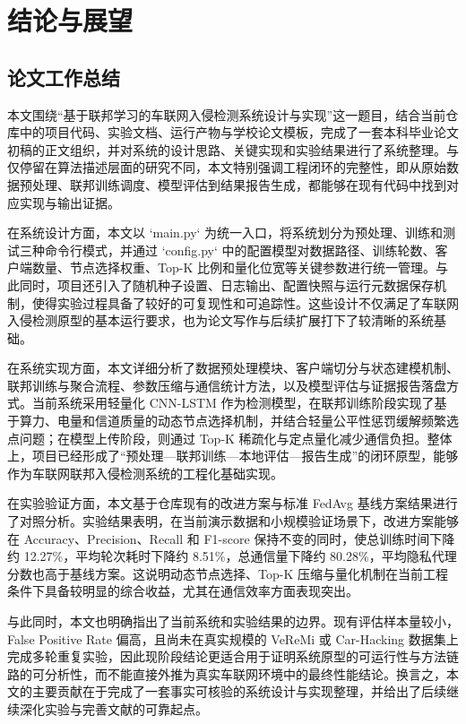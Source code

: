 \chapter{结论与展望}
\label{cha:conclusion}

\section{论文工作总结}

本文围绕“基于联邦学习的车联网入侵检测系统设计与实现”这一题目，结合当前仓库中的项目代码、实验文档、运行产物与学校论文模板，完成了一套本科毕业论文初稿的正文组织，并对系统的设计思路、关键实现和实验结果进行了系统整理。与仅停留在算法描述层面的研究不同，本文特别强调工程闭环的完整性，即从原始数据预处理、联邦训练调度、模型评估到结果报告生成，都能够在现有代码中找到对应实现与输出证据。

在系统设计方面，本文以 `main.py` 为统一入口，将系统划分为预处理、训练和测试三种命令行模式，并通过 `config.py` 中的配置模型对数据路径、训练轮数、客户端数量、节点选择权重、Top-K 比例和量化位宽等关键参数进行统一管理。与此同时，项目还引入了随机种子设置、日志输出、配置快照与运行元数据保存机制，使得实验过程具备了较好的可复现性和可追踪性。这些设计不仅满足了车联网入侵检测原型的基本运行要求，也为论文写作与后续扩展打下了较清晰的系统基础。

在系统实现方面，本文详细分析了数据预处理模块、客户端切分与状态建模机制、联邦训练与聚合流程、参数压缩与通信统计方法，以及模型评估与证据报告落盘方式。当前系统采用轻量化 CNN-LSTM 作为检测模型，在联邦训练阶段实现了基于算力、电量和信道质量的动态节点选择机制，并结合轻量公平性惩罚缓解频繁选点问题；在模型上传阶段，则通过 Top-K 稀疏化与定点量化减少通信负担。整体上，项目已经形成了“预处理—联邦训练—本地评估—报告生成”的闭环原型，能够作为车联网联邦入侵检测系统的工程化基础实现。

在实验验证方面，本文基于仓库现有的改进方案与标准 FedAvg 基线方案结果进行了对照分析。实验结果表明，在当前演示数据和小规模验证场景下，改进方案能够在 Accuracy、Precision、Recall 和 F1-score 保持不变的同时，使总训练时间下降约 12.27\%，平均轮次耗时下降约 8.51\%，总通信量下降约 80.28\%，平均隐私代理分数也高于基线方案。这说明动态节点选择、Top-K 压缩与量化机制在当前工程条件下具备较明显的综合收益，尤其在通信效率方面表现突出。

与此同时，本文也明确指出了当前系统和实验结果的边界。现有评估样本量较小，False Positive Rate 偏高，且尚未在真实规模的 VeReMi 或 Car-Hacking 数据集上完成多轮重复实验，因此现阶段结论更适合用于证明系统原型的可运行性与方法链路的可分析性，而不能直接外推为真实车联网环境中的最终性能结论。换言之，本文的主要贡献在于完成了一套事实可核验的系统设计与实现整理，并给出了后续继续深化实验与完善文献的可靠起点。

